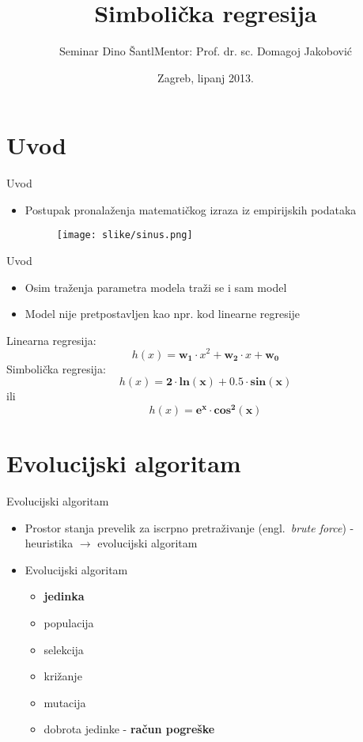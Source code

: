 \documentclass[utf8]{beamer}
\title[Simbolička regresija]{Simbolička regresija}
\author[Dino Šantl]{Seminar \newline\newline Dino Šantl\newline Mentor: Prof. dr. sc. Domagoj Jakobović}
\institute{Fakultet elektrotehnike i računarstva}
\date{Zagreb, lipanj 2013.}
\newcommand{\engl}[1]{(engl.~\emph{#1})}
\begin{document}
\begin{frame}
\titlepage
\end{frame}

\section{Uvod}
\begin{frame}{Uvod}
\begin{itemize}
\item Postupak pronalaženja matematičkog izraza iz empirijskih podataka
\begin{figure}
\centering
\texttt{[image: slike/sinus.png]}
\end{figure}
\end{itemize}
\end{frame}


\begin{frame}{Uvod}
	\begin{itemize}
		\item Osim traženja parametra modela traži se i sam model 
		\item Model nije pretpostavljen kao npr. kod linearne regresije
	\end{itemize}
	\vspace{20px}
	Linearna regresija:
	\begin{equation} 
	h(x) = \mathbf{w_{1}}\cdot x^{2} + \mathbf{w_{2}}\cdot x + \mathbf{w_{0}}
	\end{equation}
	Simbolička regresija:
	\begin{equation} 
	h(x) = \mathbf{2\cdot ln(x) + 0.5\cdot sin(x)} 
	\end{equation}
	\center
	ili
	\begin{equation} 
	h(x) = \mathbf{e^{x} \cdot cos^{2}(x)} 
	\end{equation}
\end{frame}

\section{Evolucijski algoritam}
\begin{frame}{Evolucijski algoritam}
	\begin{itemize}
		\item Prostor stanja prevelik za iscrpno pretraživanje \engl{brute force} - heuristika $\rightarrow$ evolucijski algoritam
		\item Evolucijski algoritam
		\begin{itemize}
			\item \textbf{jedinka}
			\item populacija
			\item selekcija
			\item križanje 
			\item mutacija
			\item dobrota jedinke - \textbf{račun pogreške}
		\end{itemize}
	\end{itemize}
\end{frame}
\end{document}
